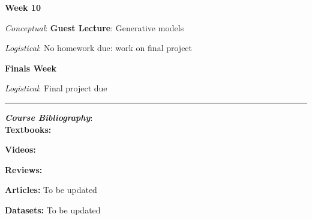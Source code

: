 \documentclass[12pt]{article}
\begin{document}
\textbf{Week 10}

\emph{Conceptual}: \textbf{Guest Lecture}: Generative models

\emph{Logistical}: No homework due: work on final project

\textbf{Finals Week}

\emph{Logistical}: Final project due

\begin{center}
	\rule{\textwidth}{0.5pt}
\end{center}

\noindent\textbf{\emph{Course Bibliography}}:\\

\textbf{Textbooks:}

\newrefsection
\nocite{Mehta:2019,Abu-Mostafa:2012,Erdman:2021,Zeljko:2014,Calafiura:2022,Chollet:2021}
\printbibliography[heading=none]

\textbf{Videos:}

\newrefsection
\nocite{3blue1brown_neuralnetwork,3blue1brown_gradientdescent}
\printbibliography[heading=none]

\textbf{Reviews:}

\newrefsection
\nocite{Carleo:2019ptp}
\printbibliography[heading=none]

\textbf{Articles:} {\color{Orange} To be updated}

\newrefsection
\nocite{deOliveira:2015xxd,Aurisano:2016jvx,Komiske:2016rsd,Khan:2018opv,Zhou:2019,Moreno:2019neq,Ormiston:2020ele,Moreno:2021fvp}
\printbibliography[heading=none]

\textbf{Datasets:} {\color{Orange} To be updated}

\newrefsection
\nocite{hbb_dataset}
\printbibliography[heading=none]
\end{document}
